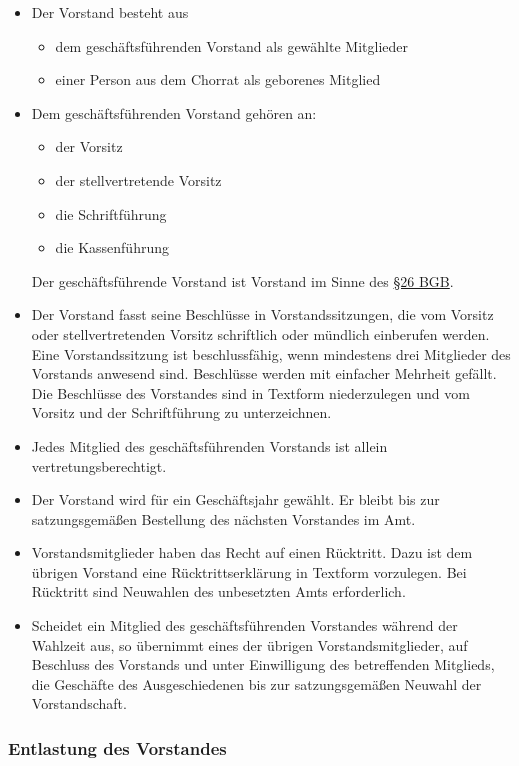 \documentclass[12pt,paper=a4,ngerman]{report}
\begin{document}
\begin{itemize}
    \item Der Vorstand besteht aus
    \begin{itemize}
        \item dem geschäftsführenden Vorstand als gewählte Mitglieder
        \item einer Person aus dem Chorrat als geborenes Mitglied
    \end{itemize}
    \item Dem geschäftsführenden Vorstand gehören an:
    \begin{itemize}
        \item der Vorsitz
        \item der stellvertretende Vorsitz
        \item die Schriftführung
        \item die Kassenführung
    \end{itemize}
    Der geschäftsführende Vorstand ist Vorstand im Sinne des \href{https://www.gesetze-im-internet.de/bgb/__26.html}{§26 BGB}.
    \item Der Vorstand fasst seine Beschlüsse in Vorstandssitzungen, die vom Vorsitz oder stellvertretenden Vorsitz schriftlich oder mündlich einberufen werden. Eine Vorstandssitzung ist beschlussfähig, wenn mindestens drei Mitglieder des Vorstands anwesend sind. Beschlüsse werden mit einfacher Mehrheit gefällt. Die Beschlüsse des Vorstandes sind in Textform niederzulegen und vom Vorsitz und der Schriftführung zu unterzeichnen.
    \item Jedes Mitglied des geschäftsführenden Vorstands ist allein vertretungsberechtigt.
    \item Der Vorstand wird für ein Geschäftsjahr gewählt. Er bleibt bis zur satzungsgemäßen Bestellung des nächsten Vorstandes im Amt.
    \item Vorstandsmitglieder haben das Recht auf einen Rücktritt. Dazu ist dem übrigen Vorstand eine Rücktrittserklärung in Textform vorzulegen. Bei Rücktritt sind Neuwahlen des unbesetzten Amts erforderlich.
    \item Scheidet ein Mitglied des geschäftsführenden Vorstandes während der Wahlzeit aus, so übernimmt eines der übrigen Vorstandsmitglieder, auf Beschluss des Vorstands und unter Einwilligung des betreffenden Mitglieds, die Geschäfte des Ausgeschiedenen bis zur satzungsgemäßen Neuwahl der Vorstandschaft.
\end{itemize}

\subsubsection{Entlastung des Vorstandes}
\end{document}
